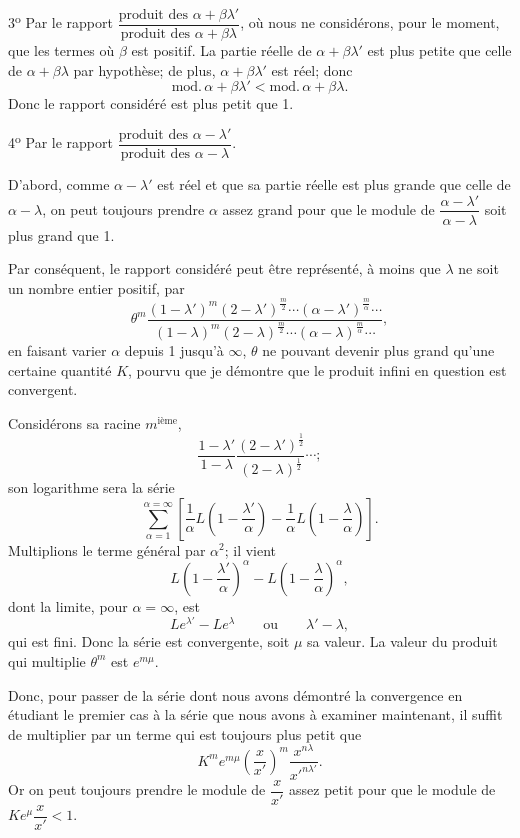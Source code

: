 \documentclass[11pt]{article}
\begin{document}
3\textsuperscript{o} Par le rapport $\dfrac{\text{produit des }\alpha+\beta\lambda'}{\text{produit des }\alpha+\beta\lambda}$, où nous ne considérons, pour le moment, que les termes où $\beta$ est positif. La partie réelle de $\alpha+\beta\lambda'$ est plus petite que celle de $\alpha+\beta\lambda$ par hypothèse; de plus, $\alpha+\beta\lambda'$ est réel; donc
\[
\mathrm{mod}.\,\alpha+\beta\lambda'<\mathrm{mod}.\,\alpha+\beta\lambda.
\]
Donc le rapport considéré est plus petit que 1.

4\textsuperscript{o} Par le rapport $\dfrac{\text{produit des }\alpha-\lambda'}{\text{produit des }\alpha-\lambda}$.

D’abord, comme $\alpha-\lambda'$ est réel et que sa partie réelle est plus grande que celle de $\alpha-\lambda$, on peut toujours prendre $\alpha$ assez grand pour que le module de $\dfrac{\alpha-\lambda'}{\alpha-\lambda}$ soit plus grand que 1.

Par conséquent, le rapport considéré peut être représenté, à moins que $\lambda$ ne soit un nombre entier positif, par
\[
\theta^m
\frac{(1-\lambda')^m(2-\lambda')^{\frac m2}\cdots(\alpha-\lambda')^{\frac m\alpha}\cdots}
{(1-\lambda)^m(2-\lambda)^{\frac m2}\cdots(\alpha-\lambda)^{\frac m\alpha}\cdots},
\]
en faisant varier $\alpha$ depuis 1 jusqu’à $\infty$, $\theta$ ne pouvant devenir plus grand qu’une certaine quantité $K$, pourvu que je démontre que le produit infini en question est convergent.

Considérons sa racine $m^{\text{ième}}$,
\[
\frac{1-\lambda'}{1-\lambda}\frac{(2-\lambda')^{\frac12}}{(2-\lambda)^{\frac12}}\cdots;
\]
son logarithme sera la série
\[
\sum_{\alpha=1}^{\alpha=\infty}\left[\frac1\alpha L\left(1-\frac{\lambda'}{\alpha}\right)-\frac1\alpha L\left(1-\frac{\lambda}{\alpha}\right)\right].
\]
Multiplions le terme général par $\alpha^2$; il vient
\[
L\left(1-\frac{\lambda'}{\alpha}\right)^\alpha-L\left(1-\frac{\lambda}{\alpha}\right)^\alpha,
\]
dont la limite, pour $\alpha=\infty$, est
\[
L e^{\lambda'}-L e^{\lambda}\qquad \text{ou}\qquad \lambda'-\lambda,
\]
qui est fini. Donc la série est convergente, soit $\mu$ sa valeur. La valeur du produit qui multiplie $\theta^m$ est $e^{m\mu}$.

Donc, pour passer de la série dont nous avons démontré la convergence en étudiant le premier cas à la série que nous avons à examiner maintenant, il suffit de multiplier par un terme qui est toujours plus petit que
\[
K^m e^{m\mu}\left(\frac{x}{x'}\right)^m\frac{x^{n\lambda}}{x'^{n\lambda'}}.
\]
Or on peut toujours prendre le module de $\dfrac{x}{x'}$ assez petit pour que le module de $Ke^\mu\dfrac{x}{x'}<1$.
\end{document}
